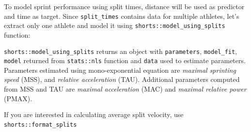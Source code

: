 \documentclass[
]{book}
\newenvironment{Shaded}{\begin{snugshade}}{\end{snugshade}}
\newcommand{\CommentTok}[1]{\textcolor[rgb]{0.56,0.35,0.01}{\textit{#1}}}
\newcommand{\DataTypeTok}[1]{\textcolor[rgb]{0.13,0.29,0.53}{#1}}
\newcommand{\KeywordTok}[1]{\textcolor[rgb]{0.13,0.29,0.53}{\textbf{#1}}}
\newcommand{\NormalTok}[1]{#1}
\newcommand{\OperatorTok}[1]{\textcolor[rgb]{0.81,0.36,0.00}{\textbf{#1}}}
\newcommand{\StringTok}[1]{\textcolor[rgb]{0.31,0.60,0.02}{#1}}
\begin{document}
To model sprint performance using split times, distance will be used as predictor and time as target. Since \texttt{split\_times} contains data for multiple athletes, let's extract only one athlete and model it using \texttt{shorts::model\_using\_splits} function:

\begin{Shaded}
\end{Shaded}

\texttt{shorts::model\_using\_splits} returns an object with \texttt{parameters}, \texttt{model\_fit}, \texttt{model} returned from \texttt{stats::nls} function and \texttt{data} used to estimate parameters. Parameters estimated using mono-exponential equation are \emph{maximal sprinting speed} (MSS), and \emph{relative acceleration} (TAU). Additional parameters computed from MSS and TAU are \emph{maximal acceleration} (MAC) and \emph{maximal relative power} (PMAX).

If you are interested in calculating average split velocity, use \texttt{shorts::format\_splits}
\end{document}
